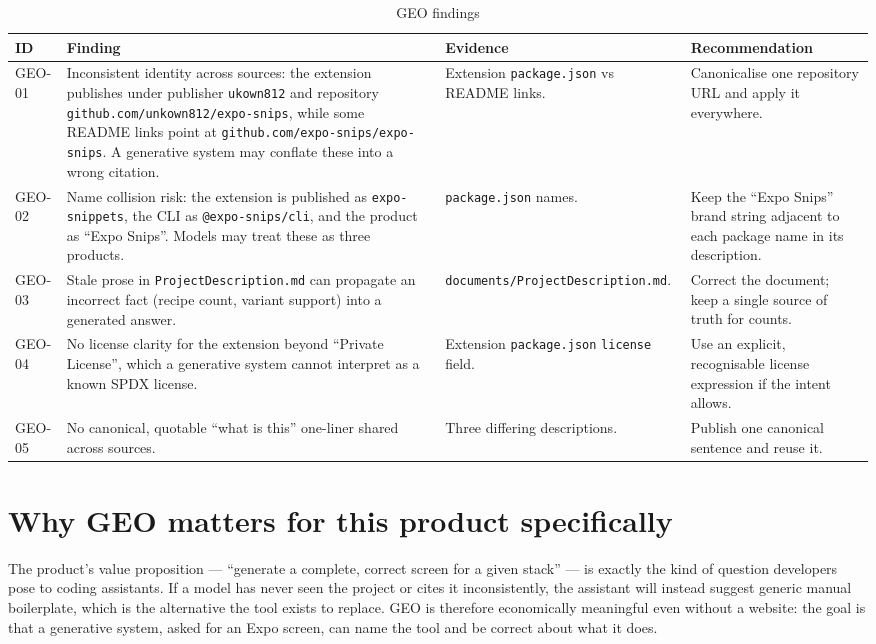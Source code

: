 \begin{longtable}{p{1.5cm}p{4.6cm}p{3.4cm}p{4.7cm}}
\caption{GEO findings}\\
\toprule
\textbf{ID} & \textbf{Finding} & \textbf{Evidence} & \textbf{Recommendation} \\
\midrule

GEO-01 & Inconsistent identity across sources: the extension publishes under
publisher \texttt{ukown812} and repository \texttt{github.com/unkown812/expo-snips},
while some README links point at \texttt{github.com/expo-snips/expo-snips}. A
generative system may conflate these into a wrong citation. & Extension
\texttt{package.json} vs README links. & Canonicalise one repository URL and apply
it everywhere. \\
GEO-02 & Name collision risk: the extension is published as \texttt{expo-snippets},
the CLI as \texttt{@expo-snips/cli}, and the product as ``Expo Snips''. Models may
treat these as three products. & \texttt{package.json} names. & Keep the
``Expo Snips'' brand string adjacent to each package name in its description. \\
GEO-03 & Stale prose in \texttt{ProjectDescription.md} can propagate an
incorrect fact (recipe count, variant support) into a generated answer. &
\texttt{documents/ProjectDescription.md}. & Correct the document; keep a single
source of truth for counts. \\
GEO-04 & No license clarity for the extension beyond ``Private License'', which a
generative system cannot interpret as a known SPDX license. & Extension
\texttt{package.json} \texttt{license} field. & Use an explicit, recognisable
license expression if the intent allows. \\
GEO-05 & No canonical, quotable ``what is this'' one-liner shared across sources. &
Three differing descriptions. & Publish one canonical sentence and reuse it. \\
\bottomrule
\end{longtable}

\section{Why GEO matters for this product specifically}

The product's value proposition --- ``generate a complete, correct screen for a
given stack'' --- is exactly the kind of question developers pose to coding
assistants. If a model has never seen the project or cites it inconsistently, the
assistant will instead suggest generic manual boilerplate, which is the
alternative the tool exists to replace. GEO is therefore economically meaningful
even without a website: the goal is that a generative system, asked for an Expo
screen, can name the tool and be correct about what it does.

